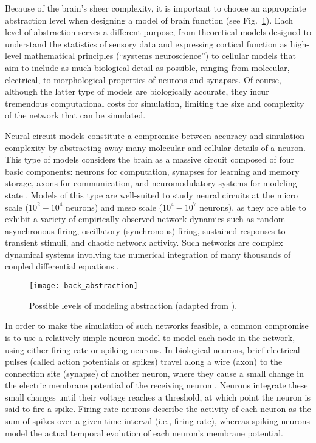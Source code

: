 Because of the brain's sheer complexity, it is important to choose
an appropriate abstraction level when designing a model of brain function
(see Fig.~\ref{fig:BKG|abstractionLevels}).
Each level of abstraction serves a different purpose, from
theoretical models designed to understand the statistics of sensory data
and expressing cortical function as high-level mathematical principles
(``systems neuroscience'') to
cellular models that aim to include as much biological detail as possible,
ranging from molecular, electrical, to morphological properties of neurons 
and synapses.
Of course, although the latter type of models are biologically accurate, 
they incur tremendous computational costs for simulation,
limiting the size and complexity of the network that can be simulated.

Neural circuit models constitute a compromise between 
accuracy and simulation complexity
by abstracting away many molecular and cellular details
of a neuron.
This type of models considers the brain as a massive circuit
composed of four basic components: neurons for computation,
synapses for learning and memory storage,
axons for communication,
and neuromodulatory systems for modeling state
\citep{FurberTemple2007,AbbottNelson2000,Brette2007}.
Models of this type are well-suited to study neural circuits at
the micro scale ($10^2-10^4$ neurons) and 
meso scale ($10^4-10^7$ neurons), as they are able to exhibit 
a variety of empirically observed network dynamics such as
random asynchronous firing,
oscillatory (synchronous) firing,
sustained responses to transient stimuli,
and chaotic network activity.
Such networks are complex dynamical systems involving the numerical
integration of many thousands of coupled differential equations
\citep{Vogels2005}.

\begin{figure}[t]
  \centering
  \texttt{[image: back\_abstraction]}
  \caption{
  Possible levels of modeling abstraction 
  (adapted from \cite{Nageswaran2010}).}
  \label{fig:BKG|abstractionLevels}
\end{figure}

In order to make the simulation of such networks feasible,
a common compromise is to use a relatively simple neuron model to
model each node in the network, using either firing-rate or
spiking neurons.
In biological neurons, brief electrical pulses 
(called action potentials or spikes) travel along a wire (axon) to the
connection site (synapse) of another neuron, where they cause a small
change in the electric membrane potential of the receiving neuron
\citep{Kandel2000}.
Neurons integrate these small changes until their voltage reaches a
threshold, at which point the neuron is said to fire a spike.
Firing-rate neurons describe the activity of each neuron as the sum of
spikes over a given time interval (i.e., firing rate),
whereas spiking neurons model the actual temporal evolution of
each neuron's membrane potential.

